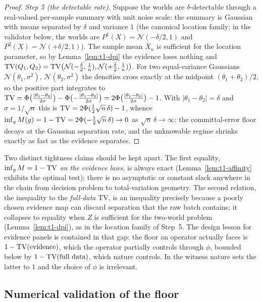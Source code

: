 \begin{proof}
\emph{Step 5 (the detectable rate).}
Suppose the worlds are $\delta$-detectable through a real-valued
per-sample summary with unit noise scale: the summary is Gaussian with
means separated by $\delta$ and variance $1$ (the canonical location
family; in the validator below, the worlds are
$P^1(X)=\mathcal N(-\delta/2,1)$ and $P^2(X)=\mathcal N(+\delta/2,1)$).
The sample mean $\bar X_n$ is sufficient for the location parameter, so by
Lemma~\ref{lem:t1-dpi} the evidence loses nothing and
$\mathrm{TV}(Q_1,Q_2)=\mathrm{TV}\bigl(\mathcal N(-\tfrac\delta2,\tfrac1n),
\mathcal N(+\tfrac\delta2,\tfrac1n)\bigr)$. For two equal-variance
Gaussians $\mathcal N(\theta_1,\sigma^2)$, $\mathcal N(\theta_2,\sigma^2)$
the densities cross exactly at the midpoint $(\theta_1+\theta_2)/2$, so
the positive part integrates to
$\mathrm{TV}=\Phi\bigl(\tfrac{|\theta_1-\theta_2|}{2\sigma}\bigr)-
\Phi\bigl(-\tfrac{|\theta_1-\theta_2|}{2\sigma}\bigr)
=2\Phi\bigl(\tfrac{|\theta_1-\theta_2|}{2\sigma}\bigr)-1$. With
$|\theta_1-\theta_2|=\delta$ and $\sigma=1/\sqrt n$ this is
$\mathrm{TV}=2\Phi(\tfrac12\sqrt n\,\delta)-1$, whence
$\inf_g M(g)=1-\mathrm{TV}=2\Phi(-\tfrac12\sqrt n\,\delta)\to0$ as $\sqrt
n\,\delta\to\infty$: the committal-error floor decays at the Gaussian
separation rate, and the unknowable regime shrinks exactly as fast as the
evidence separates.
\end{proof}

\begin{remark}\label{rem:t1-tightness}
Two distinct tightness claims should be kept apart. The first equality,
$\inf_g M=1-\mathrm{TV}$ \emph{on the evidence laws}, is always exact
(Lemma~\ref{lem:t1-affinity} exhibits the optimal test); there is no
asymptotic or constant slack anywhere in the chain from decision problem
to total-variation geometry. The second relation, the inequality to the
\emph{full-data} TV, is an inequality precisely because a poorly chosen
evidence map can discard separation that the raw batch contains; it
collapses to equality when $Z$ is sufficient for the two-world problem
(Lemma~\ref{lem:t1-dpi}), as in the location family of Step~5. The design
lesson for evidence panels is contained in that gap: the floor an
operator actually faces is $1-\mathrm{TV}(\text{evidence})$, which the operator
partially controls through $\phi$, bounded below by
$1-\mathrm{TV}(\text{full data})$, which nature controls. In the witness nature
sets the latter to $1$ and the choice of $\phi$ is irrelevant.
\end{remark}

\subsection{Numerical validation of the floor}\label{sec:t1-lecam-val}

